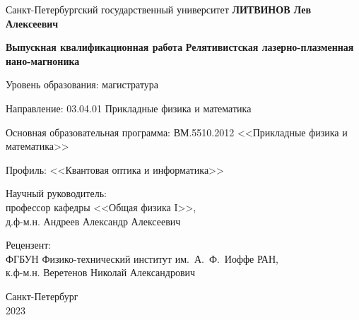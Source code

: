 \begin{titlepage}
    \begin{center} 
        
        
        Санкт-Петербургский государственный университет
        \vfill
        \textbf{ЛИТВИНОВ Лев Алексеевич}

        \textbf{Выпускная квалификационная работа}
        \vfill
        {\large\textbf{Релятивистская лазерно-плазменная нано-магноника}}
        \vfill
        {
            Уровень образования: магистратура

            Направление: 03.04.01 Прикладные физика и математика

            Основная образовательная программа: ВМ.5510.2012 <<Прикладные физика и математика>>

            Профиль: <<Квантовая оптика и информатика>>
        }

        \vfill
        
        \hfill
        \begin{minipage}{0.5\textwidth}
            \begin{flushright}
                Научный руководитель:\\ профессор кафедры <<Общая физика I>>,\\д.ф-м.н. Андреев Александр Алексеевич
            \end{flushright}
        \end{minipage}

        \vfill

        \hfill
        \begin{minipage}{0.5\textwidth}
            \begin{flushright}
                Рецензент:\\ ФГБУН Физико-технический институт им.~А.~Ф.~Иоффе РАН,\\к.ф-м.н. Веретенов Николай Александрович
            \end{flushright}
        \end{minipage}
        
        
        \vfill\vfill\vfill
        
        {Санкт-Петербург \\ 2023}
        
    \end{center}
\end{titlepage}